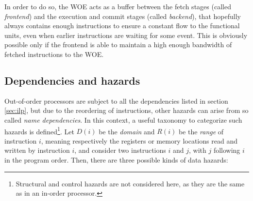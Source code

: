 In order to do so, the \ac{WOE} acts as a buffer between the fetch stages (called \emph{frontend}) and the execution and commit stages (called \emph{backend}), that hopefully always contains enough instructions to ensure a constant flow to the functional units, even when earlier instructions are waiting for some event. This is obviously possible only if the frontend is able to maintain a high enough bandwidth of fetched instructions to the \ac{WOE}.

\subsection{Dependencies and hazards}
Out-of-order processors are subject to all the dependencies listed in section \ref{sec:ilp}, but due to the reordering of instructions, other hazards can arise from so called \emph{name dependencies}. In this context, a useful taxonomy to categorize such hazards is defined\footnote{Structural and control hazards are not considered here, as they are the same as in an in-order processor.}. Let $D(i)$ be the \emph{domain} and $R(i)$ be the \emph{range} of instruction $i$, meaning respectively the registers or memory locations read and written by instruction $i$, and consider two instructions $i$ and $j$, with $j$ following $i$ in the program order. Then, there are three possible kinds of data hazards:
